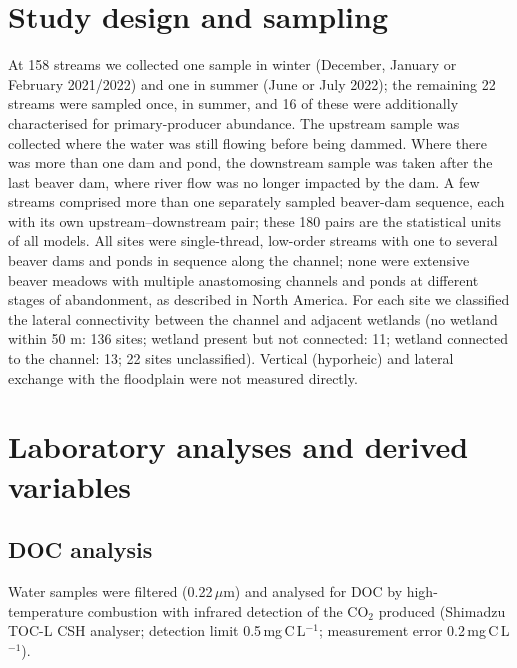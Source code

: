 \documentclass[11pt,a4paper]{article}
\begin{document}
\section{Study design and sampling}
At 158 streams we collected one sample in winter (December, January or February 2021/2022) and one in summer (June or July 2022); the remaining 22 streams were sampled once, in summer, and 16 of these were additionally characterised for primary-producer abundance. The upstream sample was collected where the water was still flowing before being dammed. Where there was more than one dam and pond, the downstream sample was taken after the last beaver dam, where river flow was no longer impacted by the dam. A few streams comprised more than one separately sampled beaver-dam sequence, each with its own upstream--downstream pair; these 180 pairs are the statistical units of all models. All sites were single-thread, low-order streams with one to several beaver dams and ponds in sequence along the channel; none were extensive beaver meadows with multiple anastomosing channels and ponds at different stages of abandonment, as described in North America. For each site we classified the lateral connectivity between the channel and adjacent wetlands (no wetland within 50 m: 136 sites; wetland present but not connected: 11; wetland connected to the channel: 13; 22 sites unclassified). Vertical (hyporheic) and lateral exchange with the floodplain were not measured directly.

\FloatBarrier
\section{Laboratory analyses and derived variables}
\subsection{DOC analysis}
Water samples were filtered (0.22\,$\mu$m) and analysed for DOC by high-temperature combustion with infrared detection of the CO$_2$ produced (Shimadzu TOC-L CSH analyser; detection limit 0.5\,mg\,C\,L$^{-1}$; measurement error 0.2\,mg\,C\,L$^{-1}$).
\end{document}
